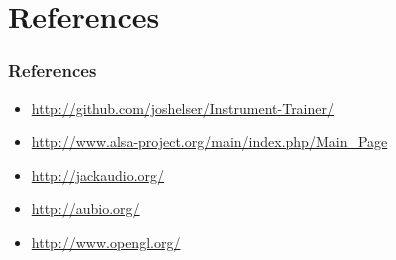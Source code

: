 \documentclass[english]{beamer}
\begin{document}
\section{References}

\begin{frame}
  \frametitle{References}
  \begin{itemize}
    \item \url{http://github.com/joshelser/Instrument-Trainer/}
    \item \url{http://www.alsa-project.org/main/index.php/Main_Page}
    \item \url{http://jackaudio.org/}
    \item \url{http://aubio.org/}
    \item \url{http://www.opengl.org/}
  \end{itemize}
\end{frame}
\end{document}
